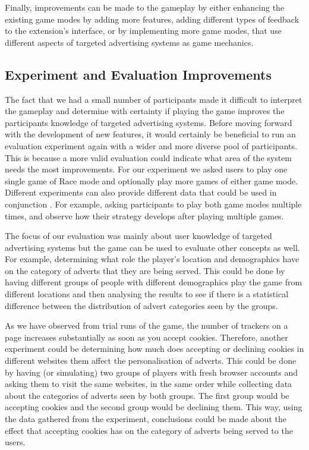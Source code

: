 \documentclass{l4proj}
\begin{document}
Finally, improvements can be made to the gameplay by either enhancing the existing game modes by adding more features, adding different types of feedback to the extension's interface, or by implementing more game modes, that use different aspects of targeted advertising systems as game mechanics.

\subsection{Experiment and Evaluation Improvements}
The fact that we had a small number of participants made it difficult to interpret the gameplay and determine with certainty if playing the game improves the participants knowledge of targeted advertising systems. Before moving forward with the development of new features, it would certainly be beneficial to run an evaluation experiment again with a wider and more diverse pool of participants. This is because a more valid evaluation could indicate what area of the system needs the most improvements. For our experiment we asked users to play one single game of Race mode and optionally play more games of either game mode. Different experiments can also provide different data that could be used in conjunction . For example, asking participants to play both game modes multiple times, and observe how their strategy develops after playing multiple games.

The focus of our evaluation was mainly about user knowledge of targeted advertising systems but the game can be used to evaluate other concepts as well. For example, determining what role the player's location and demographics have on the category of adverts that they are being served. This could be done by having different groups of people with different demographics play the game from different locations and then analysing the results to see if there is a statistical difference between the distribution of advert categories seen by the groups. 

As we have observed from trial runs of the game, the number of trackers on a page increases substantially as soon as you accept cookies. Therefore, another experiment could be determining how much does accepting or declining cookies in different websites them affect the personalisation of adverts. This could be done by having (or simulating) two groups of players with fresh browser accounts and asking them to visit the same websites, in the same order while collecting data about the categories of adverts seen by both groups. The first group would be accepting cookies and the second group would be declining them. This way, using the data gathered from the experiment, conclusions could be made about the effect that accepting cookies has on the category of adverts being served to the users. 
\end{document}
